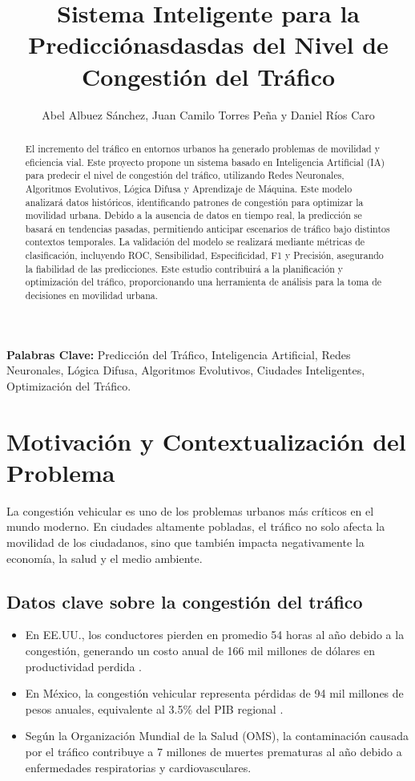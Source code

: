 \documentclass{svproc} %
\begin{document}
\title{Sistema Inteligente para la Predicciónasdasdas del Nivel de Congestión del Tráfico}
\author{Abel Albuez Sánchez, Juan Camilo Torres Peña y Daniel Ríos Caro}

\maketitle

\begin{abstract}
El incremento del tráfico en entornos urbanos ha generado problemas
de movilidad y eficiencia vial. Este proyecto propone un sistema basado en Inteligencia Artificial (IA) 
para predecir el nivel de congestión del tráfico, utilizando Redes Neuronales, Algoritmos Evolutivos, 
Lógica Difusa y Aprendizaje de Máquina. Este modelo analizará datos históricos, identificando patrones de congestión 
para optimizar la movilidad urbana. Debido a la ausencia de datos en tiempo real, 
la predicción se basará en tendencias pasadas, permitiendo anticipar escenarios de tráfico
 bajo distintos contextos temporales. La validación del modelo se realizará mediante métricas de clasificación, incluyendo ROC,
  Sensibilidad, Especificidad, F1 y Precisión, asegurando la fiabilidad de las predicciones.
   Este estudio contribuirá a la planificación y optimización del tráfico, proporcionando una herramienta de análisis para la toma de decisiones en movilidad urbana.
\end{abstract}

\noindent\textbf{Palabras Clave:} Predicción del Tráfico, Inteligencia Artificial, Redes Neuronales, Lógica Difusa, Algoritmos Evolutivos, Ciudades Inteligentes, Optimización del Tráfico.

\section{Motivación y Contextualización del Problema}
La congestión vehicular es uno de los problemas urbanos más críticos en el mundo
moderno. En ciudades altamente pobladas, el tráfico no solo afecta la movilidad de los
ciudadanos, sino que también impacta negativamente la economía, la salud y el medio
ambiente.

\subsection{Datos clave sobre la congestión del tráfico}
\begin{itemize}
    \item En EE.UU., los conductores pierden en promedio 54 horas al año debido a la
    congestión, generando un costo anual de 166 mil millones de dólares en
    productividad perdida \cite{CEPAL}.
    \item En México, la congestión vehicular representa pérdidas de 94 mil millones de
    pesos anuales, equivalente al 3.5\% del PIB regional \cite{IMCO}.
    \item Según la Organización Mundial de la Salud (OMS), la contaminación causada por
    el tráfico contribuye a 7 millones de muertes prematuras al año debido a
    enfermedades respiratorias y cardiovasculares.
\end{itemize}
\end{document}
